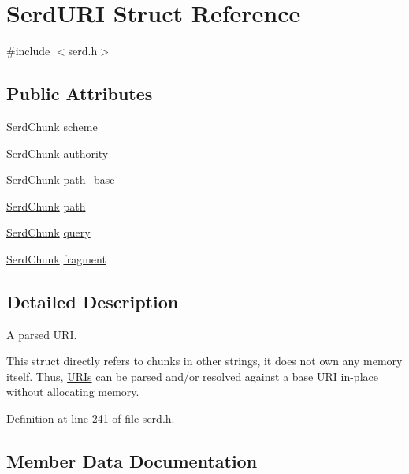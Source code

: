 \hypertarget{struct_serd_u_r_i}{}\section{Serd\+U\+RI Struct Reference}
\label{struct_serd_u_r_i}


{\ttfamily \#include $<$serd.\+h$>$}

\subsection*{Public Attributes}
\begin{DoxyCompactItemize}
\item 
\hyperlink{struct_serd_chunk}{Serd\+Chunk} \hyperlink{struct_serd_u_r_i_a98a86ede5302ca626225d097f31c2cf1}{scheme}
\item 
\hyperlink{struct_serd_chunk}{Serd\+Chunk} \hyperlink{struct_serd_u_r_i_a8e5ad5cdcf67e04b5704d879c17d8f78}{authority}
\item 
\hyperlink{struct_serd_chunk}{Serd\+Chunk} \hyperlink{struct_serd_u_r_i_a127adf8cc7c49ef5dd5cb2f2064c08ef}{path\+\_\+base}
\item 
\hyperlink{struct_serd_chunk}{Serd\+Chunk} \hyperlink{struct_serd_u_r_i_a70b1052b735a7b0b602bce0398e2ad96}{path}
\item 
\hyperlink{struct_serd_chunk}{Serd\+Chunk} \hyperlink{struct_serd_u_r_i_a807d95462e4b97801f6a24115b2cdf46}{query}
\item 
\hyperlink{struct_serd_chunk}{Serd\+Chunk} \hyperlink{struct_serd_u_r_i_ab9e639a2f3c0183c4c8d0b44dc22a00a}{fragment}
\end{DoxyCompactItemize}


\subsection{Detailed Description}
A parsed U\+RI.

This struct directly refers to chunks in other strings, it does not own any memory itself. Thus, \hyperlink{struct_u_r_is}{U\+R\+Is} can be parsed and/or resolved against a base U\+RI in-\/place without allocating memory. 

Definition at line 241 of file serd.\+h.



\subsection{Member Data Documentation}
